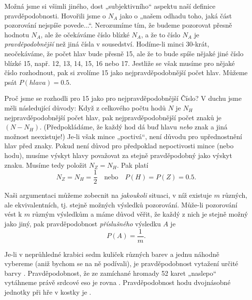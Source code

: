     Možná jsme si všimli jiného, dost „subjektivního“ aspektu naší definice pravděpodobnosti. 
    Hovořili jsme o \(N_A\) jako o „našem odhadu toho, jaká část pozorování nejspíše povede...“. 
    Nerozumíme tím, že budeme pozorovat přesně hodnotu \(N_A\), ale že očekáváme číslo blízké 
    \(N_A\), a že to číslo \(N_A\) je \emph{pravděpodobnější} než jiná čísla v sousedství. 
    Hodíme-li minci \num{30}-krát, neočekáváme, že počet hlav bude přesně \num{15}, ale že to bude 
    spíše nějaké jiné číslo blízké \num{15}, např. \num{12}, \num{13}, \num{14}, \num{15}, \num{16} 
    nebo \num{17}. Jestliže se však musíme pro nějaké číslo rozhodnout, pak si zvolíme \num{15} 
    jako nejpravděpodobnější počet hlav. Můžeme psát \(P(hlava) = \num{0.5}\).
    
    Proč jsme se rozhodli pro \num{15} jako pro nejpravděpodobnější Číslo? V duchu jsme měli 
    následující důvody: Když z celkového počtu hodů \(N\) je \(N_H\) nejpravděpodobnější počet 
    hlav, pak nejpravděpodobnější počet znaků je \((N - N_H)\). (Předpokládáme, že každý hod dá 
    buď hlavu \emph{nebo} znak a jiná možnost neexistuje!) Je-li však mince „poctivá“, není důvodu 
    pro upřednostnění hlav před znaky. Pokud není důvod pro předpoklad nepoctivosti mince (nebo 
    hodu), musíme výskyt hlavy považovat za stejně pravděpodobný jako výskyt znaku. Musíme tedy 
    položit \(N_Z = N_H\). Pak platí
    \begin{equation}\label{fyz:eq070}
      N_Z = N_H = \frac{1}{2} \quad \text{nebo}\quad P(H) = P(Z) = \num{0.5}.
    \end{equation}
    
    Naši argumentaci můžeme zobecnit na \emph{jakoukoli} situaci, v níž existuje \(m\) různých, ale 
    ekvivalentních, tj. stejně možných výsledků pozorování. Může-li pozorování vést k \(m\) různým 
    výsledkům a máme důvod věřit, že každý z nich je stejně možný jako jiný, pak pravděpodobnost 
    \emph{příslušného} výsledku \(A\) je
    \begin{equation}\label{fyz:eq071}
      P(A) = \frac{1}{m}.
    \end{equation}
    
    Je-li v neprůhledné krabici sedm kuliček různých barev a jednu náhodně vybereme (aniž bychom se 
    na ně podívali), je pravděpodobnost vytažení určité barvy . Pravděpodobnost, že ze 
    zamíchané hromady \num{52} karet „naslepo“ vytáhneme právě srdcové eso je rovna . 
    Pravděpodobnost hodu dvojnásobné jednotky při hře v kostky je .
    
